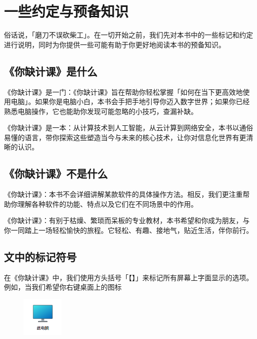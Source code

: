 \setcounter{chapter}{-1}

\chapter{一些约定与预备知识}
\label{first-things-first}

俗话说，「磨刀不误砍柴工」。在一切开始之前，我们先对本书中的一些标记和约定进行说明，同时为你提供一些可能有助于你更好地阅读本书的预备知识。

\section{《你缺计课》是什么}

《你缺计课》是一门：《你缺计课》旨在帮助你轻松掌握「如何在当下更高效地使用电脑」。如果你是电脑小白，本书会手把手地引导你迈入数字世界；如果你已经熟悉电脑操作，它也能助你发现可能忽略的小技巧，查漏补缺。

《你缺计课》是一本：从计算技术到人工智能，从云计算到网络安全，本书以通俗易懂的语言，带你探索这些塑造当今与未来的核心技术，让你对信息化世界有更清晰的认识。

\section{《你缺计课》不是什么}

《你缺计课》：本书不会详细讲解某款软件的具体操作方法。相反，我们更注重帮助你理解各种软件的功能、特点以及它们在不同场景中的作用。

《你缺计课》：有别于枯燥、繁琐而呆板的专业教材，本书希望和你成为朋友，与你一同踏上一场轻松愉快的旅程。它轻松、有趣、接地气，贴近生活，伴你前行。

\section{文中的标记符号}

在《你缺计课》中，我们使用方头括号「【】」来标记所有屏幕上字面显示的选项。例如，当我们希望你右键桌面上的图标
\begin{figure}[htb!]
  \centering
  \includegraphics[width=2cm]{assets/basic/This_PC.png}
\end{figure}


